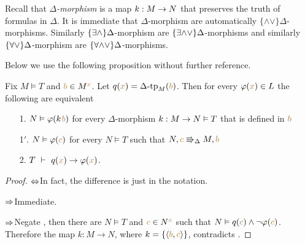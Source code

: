 % 
% 



Recall that \emph{$\Delta$-morphism\/} is a map $k:M\rightarrow N$ that preserves the truth of formulas in $\Delta$. It is immediate that $\Delta$-morphism are automatically $\{\mathord\wedge\mathord\vee\}\Delta$-morphisms. Similarly $\{\exists\wedge\}\Delta$-morphism are $\{\exists\mathord\wedge\mathord\vee\}\Delta$-morphisms and similarly $\{\forall\vee\}\Delta$-morphism are $\{\forall\mathord\wedge\mathord\vee\}\Delta$-morphisms.

Below we use the following proposition without further reference.
\def\.{\kern0.2ex}
\begin{proposition}\label{prop_pokj}
Fix $M\models T$ and ${\color{brown} b}\in M^{\color{brown} x}$. Let $q({\color{brown} x})=\Delta\mbox{\rm -tp}_M({\color{brown} b})$. Then for every $\varphi({\color{brown} x})\in L$ the following are equivalent
\begin{itemize}
\item[1.] $N\models\phi(k\.{\mr b})$ for every $\Delta$-morphism $k:M\rightarrow N\vDash T$ that is defined in ${\color{brown} b}$
\item[1$'$.] $N\vDash\varphi({\color{brown} c})$ for every $N\models T$ such that $N,{\color{brown} c}\Rrightarrow_\Delta  M,{\color{brown} b}$
\item[2.] $T\ \proves\  q({\mr x})\imp\phi({\mr x})$.
\end{itemize}
\end{proposition}
\begin{proof} $\Leftrightarrow$\quad In fact, the difference is just in the notation.

$\Rightarrow$\quad Immediate.  

$\Rightarrow$\quad Negate , then there are $N\models T$ and ${\color{brown} c}\in N^{\color{brown} x}$ such that $N\vDash q({\color{brown} c})\wedge\neg\varphi({\color{brown} c})$. Therefore the map $k:M\to N$, where $k=\{\langle{\color{brown}b},{\color{brown} c}\rangle\}$, contradicts .
\end{proof}

